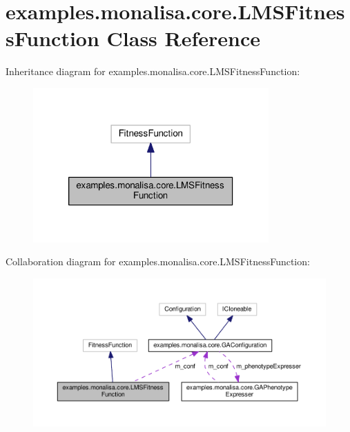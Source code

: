 \hypertarget{classexamples_1_1monalisa_1_1core_1_1_l_m_s_fitness_function}{\section{examples.\-monalisa.\-core.\-L\-M\-S\-Fitness\-Function Class Reference}
\label{classexamples_1_1monalisa_1_1core_1_1_l_m_s_fitness_function}
}


Inheritance diagram for examples.\-monalisa.\-core.\-L\-M\-S\-Fitness\-Function\-:
\nopagebreak
\begin{figure}[H]
\begin{center}
\leavevmode
\includegraphics[width=256pt]{classexamples_1_1monalisa_1_1core_1_1_l_m_s_fitness_function__inherit__graph}
\end{center}
\end{figure}


Collaboration diagram for examples.\-monalisa.\-core.\-L\-M\-S\-Fitness\-Function\-:
\nopagebreak
\begin{figure}[H]
\begin{center}
\leavevmode
\includegraphics[width=350pt]{classexamples_1_1monalisa_1_1core_1_1_l_m_s_fitness_function__coll__graph}
\end{center}
\end{figure}
